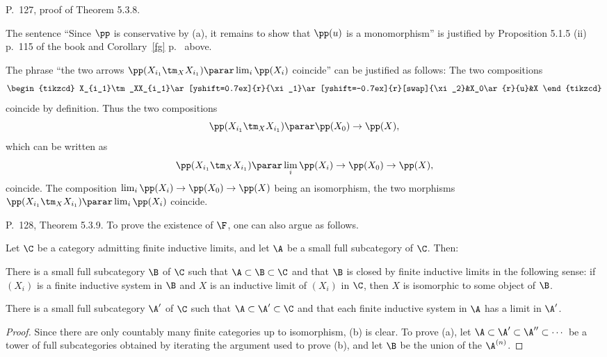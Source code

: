 \documentclass[12pt]{article}
\theoremstyle{remark}
\theoremstyle{definition}
\begin{document}


\begin{s}
P.~127, proof of Theorem 5.3.8. 

The sentence ``Since $\pp$ is conservative by (a), it remains to show that $\pp(u)$ is a monomorphism'' is justified by Proposition 5.1.5 (ii) p.~115 of the book and Corollary~\ref{fg} p.~ above.

The phrase ``the two arrows $\pp(X_{i_1}\tm_XX_{i_1})\parar\lim_i\pp(X_i)$ coincide'' can be justified as follows: The two compositions  
$$
\begin{tikzcd}
X_{i_1}\tm_XX_{i_1}\ar[yshift=0.7ex]{r}{\xi_1}\ar[yshift=-0.7ex]{r}[swap]{\xi_2}&X_0\ar{r}{u}&X
\end{tikzcd}
$$ 
coincide by definition. Thus the two compositions  
$$
\pp(X_{i_1}\tm_XX_{i_1})\parar\pp(X_0)\to\pp(X),
$$ 
which can be written as 
$$
\pp(X_{i_1}\tm_XX_{i_1})\parar\lim_i\pp(X_i)\to\pp(X_0)\to\pp(X),
$$
coincide. The composition $\lim_i\pp(X_i)\to\pp(X_0)\to\pp(X)$ being an isomorphism, the two morphisms $\pp(X_{i_1}\tm_XX_{i_1})\parar\lim_i\pp(X_i)$ coincide.
\end{s}

%

\begin{s}
P.~128, Theorem 5.3.9. To prove the existence of $\F$, one can also argue as follows. 

\begin{lem} 
Let $\C$ be a category admitting finite inductive limits, and let $\A$ be a small full subcategory of $\C$. Then:

 There is a small full subcategory $\B$ of $\C$ such that $\A\subset\B\subset \C$ and that $\B$ is closed by finite inductive limits in the following sense: if $(X_i)$ is a finite inductive system in $\B$ and $X$ is an inductive limit of $(X_i)$ in $\C$, then $X$ is isomorphic to some object of $\B$.

 There is a small full subcategory $\A'$ of $\C$ such that $\A\subset\A'\subset \C$ and that each finite inductive system in $\A$ has a limit in $\A'$. 
\end{lem} 

\begin{proof}
Since there are only countably many finite categories up to isomorphism, (b) is clear. To prove (a), let $\A\subset\A'\subset\A''\subset\cdots$ be a tower of full subcategories obtained by iterating the argument used to prove (b), and let $\B$ be the union of the $\A^{(n)}$.
\end{proof}
\end{s}
\end{document}
